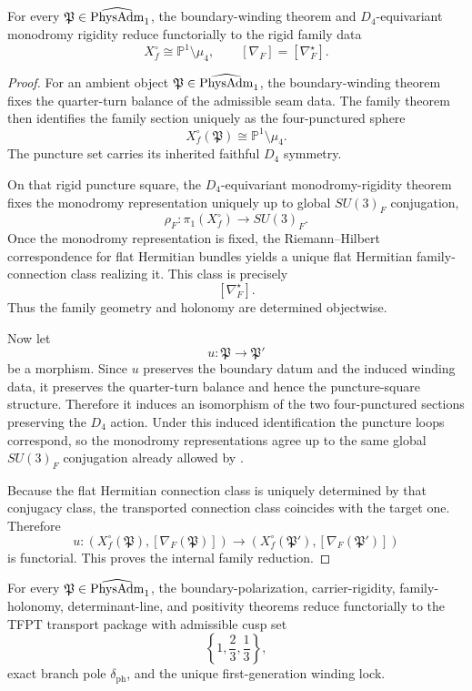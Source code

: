 \begin{theorem}
\label{prop:universal-family-reduction}
For every $\mathfrak P\in\widehat{\mathrm{PhysAdm}}_1$, the boundary-winding theorem and $D_4$-equivariant
monodromy rigidity reduce functorially to
the rigid family data
\[
X_f^\circ\cong \mathbb P^1\setminus\mu_4,
\qquad
[\nabla_F]=[\nabla_F^\star].
\]
\end{theorem}

\begin{proof}
For an ambient object $\mathfrak P\in\widehat{\mathrm{PhysAdm}}_1$, the boundary-winding theorem fixes the
quarter-turn balance of the admissible seam data. The family theorem then identifies the family
section uniquely as the four-punctured sphere
\[
X_f^\circ(\mathfrak P)\cong \mathbb P^1\setminus\mu_4.
\]
The puncture set carries its inherited faithful $D_4$ symmetry.

On that rigid puncture square, the $D_4$-equivariant monodromy-rigidity theorem fixes the
monodromy representation uniquely up to global $SU(3)_F$ conjugation,
\[
\rho_F:\pi_1(X_f^\circ)\to SU(3)_F.
\]
Once the monodromy representation is fixed, the Riemann--Hilbert correspondence for flat Hermitian
bundles yields a unique flat Hermitian family-connection class realizing it. This class is
precisely
\[
[\nabla_F^\star].
\]
Thus the family geometry and holonomy are determined objectwise.

Now let
\[
u:\mathfrak P\to \mathfrak P'
\]
be a morphism. Since $u$ preserves the boundary datum and the induced winding data, it preserves the
quarter-turn balance and hence the puncture-square structure. Therefore it induces an isomorphism
of the two four-punctured sections preserving the $D_4$ action. Under this induced identification
the puncture loops correspond, so the monodromy representations agree up to the same global
$SU(3)_F$ conjugation already allowed by .

Because the flat Hermitian connection class is uniquely determined by that conjugacy class, the
transported connection class coincides with the target one. Therefore
\[
u:(X_f^\circ(\mathfrak P),[\nabla_F(\mathfrak P)])
\longrightarrow
(X_f^\circ(\mathfrak P'),[\nabla_F(\mathfrak P')])
\]
is functorial. This proves the internal family reduction.
\end{proof}

\begin{theorem}
\label{prop:universal-transport-reduction}
For every $\mathfrak P\in\widehat{\mathrm{PhysAdm}}_1$, the boundary-polarization, carrier-rigidity,
family-holonomy, determinant-line, and positivity theorems reduce functorially to
the TFPT transport package with admissible cusp set
\[
\left\{1,\frac23,\frac13\right\},
\]
exact branch pole $\delta_{\mathrm{ph}}$, and the unique first-generation winding lock.
\end{theorem}


